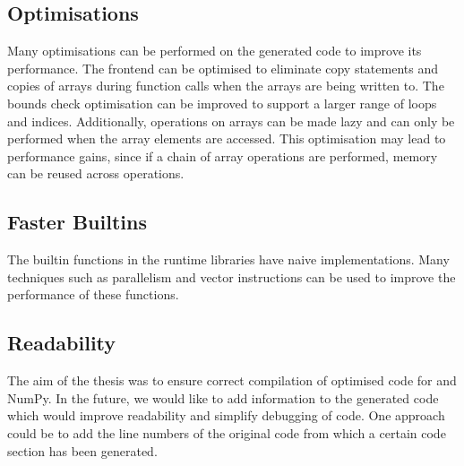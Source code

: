 \subsection{Optimisations}
Many optimisations can be performed on the generated code to improve its performance. The \matlab frontend can be optimised to eliminate copy statements and copies of arrays  during function calls when the arrays are being written to. The bounds check optimisation can be improved to support a larger range of loops and indices. Additionally, operations on arrays can be made lazy and can only be performed when the array elements are accessed. This optimisation may lead to performance gains, since if a chain of array operations are performed, memory can be reused across operations. 
\subsection{Faster Builtins}
The builtin functions in the runtime libraries have naive implementations. Many techniques such as parallelism and vector instructions can be used to improve the performance of these functions. 
\subsection{Readability}
The aim of the thesis was to ensure correct compilation of optimised code for \matlab and NumPy. In the future, we would like to add information to the generated code which would improve readability and simplify debugging of code. One approach could be to add the line numbers of the original code from which a certain code section has been generated. 

